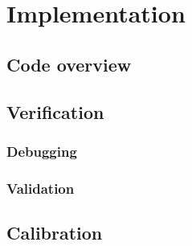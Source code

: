 \section{Implementation}

\subsection{Code overview}

\subsection{Verification}

\subsubsection{Debugging}

\subsubsection{Validation}

\subsection{Calibration}